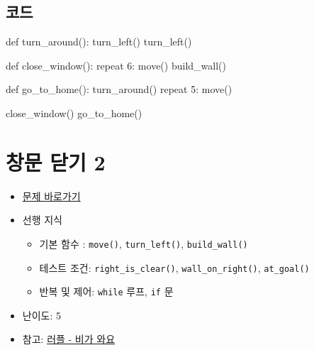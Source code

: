 \documentclass[
  b5paperpaper,
  DIV=11,
  numbers=noendperiod]{scrreprt}
\newenvironment{Shaded}{\begin{snugshade}}{\end{snugshade}}
\newcommand{\ControlFlowTok}[1]{\textcolor[rgb]{0.00,0.23,0.31}{#1}}
\newcommand{\DecValTok}[1]{\textcolor[rgb]{0.68,0.00,0.00}{#1}}
\newcommand{\FunctionTok}[1]{\textcolor[rgb]{0.28,0.35,0.67}{#1}}
\newcommand{\NormalTok}[1]{\textcolor[rgb]{0.00,0.23,0.31}{#1}}
\newcommand{\SpecialCharTok}[1]{\textcolor[rgb]{0.37,0.37,0.37}{#1}}
\providecommand{\tightlist}{%
  \setlength{\itemsep}{0pt}\setlength{\parskip}{0pt}}\usepackage{longtable,booktabs,array}
\begin{document}
\hypertarget{uxcf54uxb4dc-20}{%
\subsection{코드}\label{uxcf54uxb4dc-20}}

\begin{Shaded}
\begin{Highlighting}[]
\NormalTok{def }\FunctionTok{turn\_around}\NormalTok{()}\SpecialCharTok{:}
    \FunctionTok{turn\_left}\NormalTok{()    }
    \FunctionTok{turn\_left}\NormalTok{()}

\NormalTok{def }\FunctionTok{close\_window}\NormalTok{()}\SpecialCharTok{:}
    \ControlFlowTok{repeat} \DecValTok{6}\SpecialCharTok{:}
        \FunctionTok{move}\NormalTok{()}
    \FunctionTok{build\_wall}\NormalTok{()    }

\NormalTok{def }\FunctionTok{go\_to\_home}\NormalTok{()}\SpecialCharTok{:}
    \FunctionTok{turn\_around}\NormalTok{()    }
    \ControlFlowTok{repeat} \DecValTok{5}\SpecialCharTok{:}
        \FunctionTok{move}\NormalTok{()}

\FunctionTok{close\_window}\NormalTok{()        }
\FunctionTok{go\_to\_home}\NormalTok{()}
\end{Highlighting}
\end{Shaded}

\hypertarget{rain-02}{%
\section{창문 닫기 2}\label{rain-02}}

\begin{itemize}
\tightlist
\item
  \href{https://reeborg.ca/reeborg.html?lang=ko-en\&mode=python\&menu=worlds\%2Fmenus\%2Freeborg_intro_en.json\&name=Rain\%201\&url=worlds\%2Ftutorial_en\%2Frain1.json}{문제
  바로가기}
\item
  선행 지식

  \begin{itemize}
  \tightlist
  \item
    기본 함수 : \texttt{move()}, \texttt{turn\_left()},
    \texttt{build\_wall()}
  \item
    테스트 조건: \texttt{right\_is\_clear()},
    \texttt{wall\_on\_right()}, \texttt{at\_goal()}
  \item
    반복 및 제어: \texttt{while} 루프, \texttt{if} 문
  \end{itemize}
\item
  난이도: 5
\item
  참고: \href{http://statkclee.github.io/rur-ple/intro/22-rain.htm}{러플
  - 비가 와요}
\end{itemize}
\end{document}
